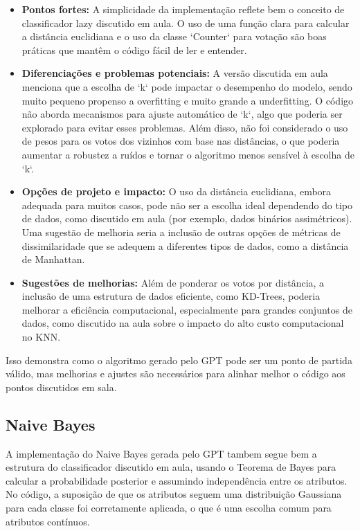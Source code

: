 \documentclass[12pt]{article}
\begin{document}
\begin{itemize}
    \item \textbf{Pontos fortes:} A simplicidade da implementação reflete bem o conceito de classificador lazy discutido em aula. O uso de uma função clara para calcular a distância euclidiana e o uso da classe `Counter` para votação são boas práticas que mantêm o código fácil de ler e entender.
    
    \item \textbf{Diferenciações e problemas potenciais:} A versão discutida em aula menciona que a escolha de `k` pode impactar o desempenho do modelo, sendo muito pequeno propenso a overfitting e muito grande a underfitting. O código não aborda mecanismos para ajuste automático de `k`, algo que poderia ser explorado para evitar esses problemas. Além disso, não foi considerado o uso de pesos para os votos dos vizinhos com base nas distâncias, o que poderia aumentar a robustez a ruídos e tornar o algoritmo menos sensível à escolha de `k`.

    \item \textbf{Opções de projeto e impacto:} O uso da distância euclidiana, embora adequada para muitos casos, pode não ser a escolha ideal dependendo do tipo de dados, como discutido em aula (por exemplo, dados binários assimétricos). Uma sugestão de melhoria seria a inclusão de outras opções de métricas de dissimilaridade que se adequem a diferentes tipos de dados, como a distância de Manhattan.
    
    \item \textbf{Sugestões de melhorias:} Além de ponderar os votos por distância, a inclusão de uma estrutura de dados eficiente, como KD-Trees, poderia melhorar a eficiência computacional, especialmente para grandes conjuntos de dados, como discutido na aula sobre o impacto do alto custo computacional no KNN.
\end{itemize}

Isso demonstra como o algoritmo gerado pelo GPT pode ser um ponto de partida válido, mas melhorias e ajustes são necessários para alinhar melhor o código aos pontos discutidos em sala.

\subsection{Naive Bayes}

A implementação do Naive Bayes gerada pelo GPT tambem segue bem a estrutura do classificador discutido em aula, usando o Teorema de Bayes para calcular a probabilidade posterior e assumindo independência entre os atributos. No código, a suposição de que os atributos seguem uma distribuição Gaussiana para cada classe foi corretamente aplicada, o que é uma escolha comum para atributos contínuos.
\end{document}
